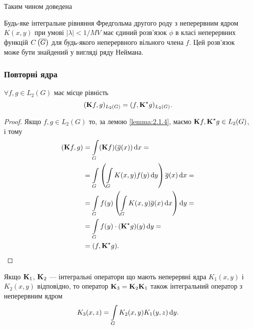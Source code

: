 Таким чином доведена
\begin{theorem}
	Будь-яке інтегральне рівняння Фредгольма другого роду з неперервним ядром $K(x, y)$ при умові $|\lambda| < 1 / MV$ має єдиний розв'язок $\phi$ в класі неперервних функцій $\CoG$ для будь-якого неперервного вільного члена $f$. Цей роз\-в'я\-зок може бути знайдений у вигляді ряду Неймана.
\end{theorem}

\allowbreak

\subsubsection{Повторні ядра}

\begin{proposition}
	$\forall f, g \in L_2(G)$ має місце рівність 
	\begin{equation}
		(\bf{K}f,g)_{L_2(G)} = (f, \bf{K}^\star g)_{L_2(G)}.
	\end{equation}
\end{proposition}

\begin{proof}
	Якщо $f, g \in L_2(G)$ то, за лемою \ref{lemma:2.1.4}, маємо $\bf{K}f, \bf{K}^\star g \in L_2(G)$, і тому
	\begin{equation}
		\begin{aligned}
			(\bf{K}f, g) &= \Int_G (\bf{K}f)(\overline g(x)) \diff x = \\
			&= \Int_G \left( \Int_G K(x, y) f(y) \diff y\right) \overline{g}(x) \diff x = \\
			&= \Int_G f(y) \left( \Int_G K(x, y) \overline g(x) \diff x\right) \diff y = \\
			&= \Int_G f(y) \cdot (\bf{K}^\star  g)(y) \diff y = \\
			&= (f, \bf{K}^\star g).
		\end{aligned}
	\end{equation}
\end{proof}

\begin{lemma}
	Якщо $\bf{K}_1$, $\bf{K}_2$ --- інтегральні оператори що мають неперервні ядра $K_1(x, y)$ і $K_2(x, y)$ відповідно, то оператор $\bf{K}_3 = \bf{K}_2 \bf{K}_1$ також інтегральний оператор з неперервним ядром
	\begin{equation}
		K_3(x, z) = \Int_G K_2(x, y) K_1(y, z) \diff y.
	\end{equation}
\end{lemma}

